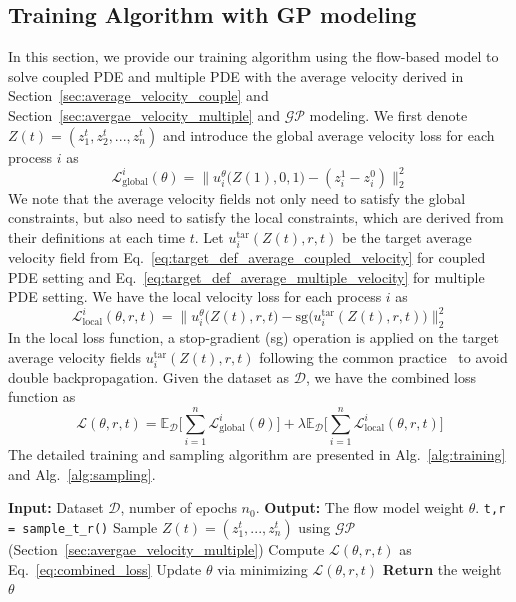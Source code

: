 \documentclass{article}
\begin{document}
\subsection{Training Algorithm with GP modeling}
In this section, we provide our training algorithm using the flow-based model to solve coupled PDE and multiple PDE with the average velocity derived in Section~\ref{sec:average_velocity_couple} and Section~\ref{sec:avergae_velocity_multiple} and $\mathcal{GP}$ modeling. We first denote $Z(t) = (z^t_1, z^t_2, ..., z^t_n)$ and introduce the global average velocity loss for each process $i$ as 
\begin{equation}
    \mathcal{L}^{i}_{\text{global}}(\theta) = \|u^{\theta}_i\big(Z(1), 0,1 \big) - (z^1_i - z^0_i)\|^2_2
\end{equation}
We note that the average velocity fields not only need to satisfy the global constraints, but also need to satisfy the local constraints, which are derived from their definitions at each time $t$. Let $u_i^{\text{tar}}(Z(t),r,t)$ be the target average velocity field from Eq.~\ref{eq:target_def_average_coupled_velocity} for coupled PDE setting and Eq.~\ref{eq:target_def_average_multiple_velocity} for multiple PDE setting. We have the local velocity loss for each process $i$ as 
\begin{equation}
    \mathcal{L}^{i}_{\text{local}}(\theta, r,t) = \|u^{\theta}_i\big(Z(t), r,t\big) - \text{sg}\big(u_i^{\text{tar}}(Z(t),r,t)\big) \|^2_2
\end{equation}
In the local loss function, a stop-gradient (sg) operation is applied on the target average velocity fields $u_i^{\text{tar}}(Z(t),r,t)$ following the common practice~\citep{geng2025mean} to avoid double backpropagation. Given the dataset as $\mathcal{D}$, we have the combined loss function as 
\begin{equation}
    \mathcal{L}(\theta,r,t) = \mathbb{E}_{\mathcal{D}}\Big[\sum_{i=1}^n \mathcal{L}^i_{\text{global}}(\theta)\Big] + \lambda \mathbb{E}_{\mathcal{D}}\Big[\sum_{i=1}^n \mathcal{L}^i_{\text{local}}(\theta, r,t)\Big] \label{eq:combined_loss}
\end{equation}
The detailed training and sampling algorithm are presented in Alg.~\ref{alg:training} and Alg.~\ref{alg:sampling}. 
\begin{algorithm}
\caption{Training Algorithm with GP modeling}
\label{alg:training}
\begin{algorithmic}[1]
\STATE \textbf{Input:} Dataset $\mathcal{D}$, number of epochs $n_0$.
\STATE \textbf{Output:} The flow model weight $\theta$.
    \STATE  \texttt{t,r = sample\_t\_r()}
    \STATE Sample $Z(t) = (z^t_1,...,z^t_n)$ using $\mathcal{GP}$ (Section~\ref{sec:avergae_velocity_multiple}) 
    \STATE Compute $\mathcal{L}(\theta,r,t)$ as Eq.~\ref{eq:combined_loss}
    \STATE Update $\theta$ via minimizing $\mathcal{L}(\theta,r,t)$
\ENDFOR
\STATE \textbf{Return} the weight $\theta$
\end{algorithmic}
\end{algorithm}
\end{document}
